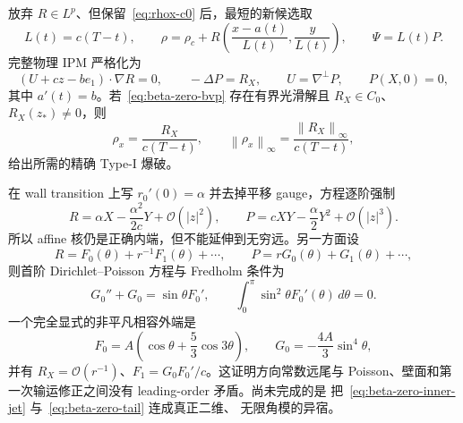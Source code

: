 \documentclass[11pt,a4paper,fontset=fandol]{ctexart}
\newcommand{\norm}[1]{\left\lVert #1\right\rVert}
\newcommand{\Order}{\mathcal O}
\begin{document}
放弃 $R\in L^p$、但保留~\eqref{eq:rhox-c0} 后，最短的新候选取
\begin{equation}
  L(t)=c(T-t),\qquad
  \rho=\rho_c+R\!\left(\frac{x-a(t)}{L(t)},\frac{y}{L(t)}\right),
  \qquad
  \Psi=L(t)P.
\end{equation}
完整物理 IPM 严格化为
\begin{equation}
  (U+cz-be_1)\cdot\nabla R=0,
  \qquad
  -\Delta P=R_X,
  \qquad U=\nabla^\perp P,
  \qquad P(X,0)=0,
  \label{eq:beta-zero-bvp}
\end{equation}
其中 $a'(t)=b$。若~\eqref{eq:beta-zero-bvp} 存在有界光滑解且
$R_X\in C_0$、$R_X(z_*)\ne0$，则
\begin{equation}
  \rho_x=\frac{R_X}{c(T-t)},
  \qquad
  \norm{\rho_x}_\infty
  =\frac{\norm{R_X}_\infty}{c(T-t)},
  \label{eq:beta-zero-type-i}
\end{equation}
给出所需的精确 Type-I 爆破。

在 wall transition 上写 $r_0'(0)=\alpha$ 并去掉平移 gauge，方程逐阶强制
\begin{equation}
  R=\alpha X-\frac{\alpha^2}{2c}Y+\Order(|z|^2),
  \qquad
  P=cXY-\frac{\alpha}{2}Y^2+\Order(|z|^3).
  \label{eq:beta-zero-inner-jet}
\end{equation}
所以 affine 核仍是正确内端，但不能延伸到无穷远。另一方面设
\begin{equation}
  R=F_0(\theta)+r^{-1}F_1(\theta)+\cdots,
  \qquad
  P=rG_0(\theta)+G_1(\theta)+\cdots,
\end{equation}
则首阶 Dirichlet--Poisson 方程与 Fredholm 条件为
\begin{equation}
  G_0''+G_0=\sin\theta F_0',
  \qquad
  \int_0^\pi\sin^2\theta F_0'(\theta)\,d\theta=0.
\end{equation}
一个完全显式的非平凡相容外端是
\begin{equation}
  \boxed{
  F_0=A\left(\cos\theta+\frac53\cos3\theta\right),
  \qquad
  G_0=-\frac{4A}{3}\sin^4\theta,}
  \label{eq:beta-zero-tail}
\end{equation}
并有 $R_X=\Order(r^{-1})$、$F_1=G_0F_0'/c$。这证明方向常数远尾与
Poisson、壁面和第一次输运修正之间没有 leading-order 矛盾。尚未完成的是
把~\eqref{eq:beta-zero-inner-jet} 与~\eqref{eq:beta-zero-tail} 连成真正二维、
无限角模的异宿。
\end{document}
